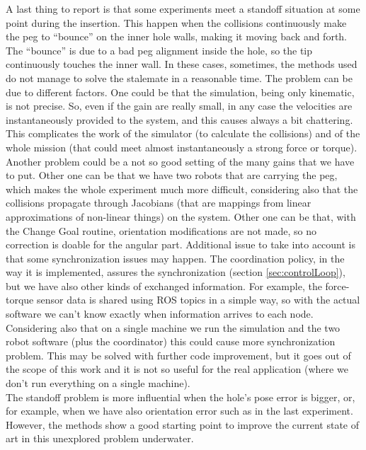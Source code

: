 A last thing to report is that some experiments meet a standoff situation at some point during the insertion. This happen when the collisions continuously make the peg to \enquote{bounce} on the inner hole walls, making it moving back and forth. The \enquote{bounce} is due to a bad peg alignment inside the hole, so the tip continuously touches the inner wall. In these cases, sometimes, the methods used do not manage to solve the stalemate in a reasonable time. The problem can be due to different factors. One could be that the simulation, being only kinematic, is not precise. So, even if the gain are really small, in any case the velocities are instantaneously provided to the system, and this causes always a bit chattering. This complicates the work of the simulator (to calculate the collisions) and of the whole mission (that could meet almost instantaneously a strong force or torque). Another problem could be a not so good setting of the many gains that we have to put. Other one can be that we have two robots that are carrying the peg, which makes the whole experiment much more difficult, considering also that the collisions propagate through Jacobians (that are mappings from linear approximations of non-linear things) on the system. Other one can be that, with the Change Goal routine, orientation modifications are not made, so no correction is doable for the angular part. Additional issue to take into account is that some synchronization issues may happen. The coordination policy, in the way it is implemented, assures the synchronization (section \ref{sec:controlLoop}), but we have also other kinds of exchanged information. For example, the force-torque sensor data is shared using ROS topics in a simple way, so with the actual software we can't know exactly when information arrives to each node. Considering also that on a single machine we run the simulation and the two robot software (plus the coordinator) this could cause more synchronization problem. This may be solved with further code improvement, but it goes out of the scope of this work and it is not so useful for the real application (where we don't run everything on a single machine).\\
The standoff problem is more influential when the hole's pose error is bigger, or, for example, when we have also orientation error such as in the last experiment. However, the methods show a good starting point to improve the current state of art in this unexplored problem underwater.
